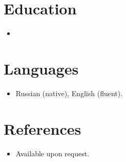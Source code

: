 \documentclass[11pt,a4paper,sans]{moderncv}
\begin{document}
\section{Education}
\vspace{1pt}
\begin{itemize}

\item{}

\end{itemize}


\section{Languages}
\vspace{1pt}
\begin{itemize}
\item Russian (native), English (fluent).
\end{itemize}


\section{References}
\vspace{1pt}
\begin{itemize}
\item{Available upon request.}
\end{itemize}
\end{document}
